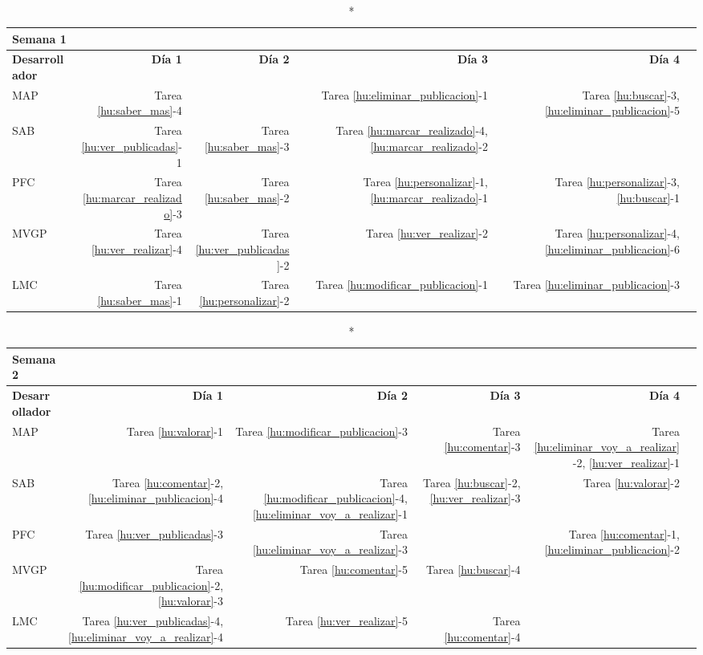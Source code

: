 \documentclass[11pt]{article}
\begin{document}
\begin{longtable}{lrrrrr}
  \caption*{Semana 1}\\
  \toprule
  \textbf{Desarrollador} & \textbf{Día 1} & \textbf{Día 2} & \textbf{Día 3} & \textbf{Día 4} \\
  \midrule
  MAP & Tarea \ref{hu:saber_mas}-4 &  & Tarea \ref{hu:eliminar_publicacion}-1 & Tarea \ref{hu:buscar}-3, \ref{hu:eliminar_publicacion}-5    \\
  SAB & Tarea \ref{hu:ver_publicadas}-1 & Tarea \ref{hu:saber_mas}-3 &  Tarea \ref{hu:marcar_realizado}-4, \ref{hu:marcar_realizado}-2 & \\
  PFC &Tarea \ref{hu:marcar_realizado}-3 & Tarea \ref{hu:saber_mas}-2 & Tarea \ref{hu:personalizar}-1, \ref{hu:marcar_realizado}-1 & Tarea \ref{hu:personalizar}-3, \ref{hu:buscar}-1\\
  MVGP &Tarea \ref{hu:ver_realizar}-4 & Tarea \ref{hu:ver_publicadas}-2  & Tarea \ref{hu:ver_realizar}-2 &Tarea \ref{hu:personalizar}-4, \ref{hu:eliminar_publicacion}-6 \\
  LMC & Tarea \ref{hu:saber_mas}-1 & Tarea \ref{hu:personalizar}-2 &Tarea  \ref{hu:modificar_publicacion}-1 & Tarea \ref{hu:eliminar_publicacion}-3 \\
  \bottomrule
\end{longtable}

\begin{longtable}{lrrrrr}
  \caption*{Semana 2}\\
  \toprule
  \textbf{Desarrollador} & \textbf{Día 1} & \textbf{Día 2} & \textbf{Día 3} & \textbf{Día 4} \\
  \midrule
  MAP & Tarea \ref{hu:valorar}-1 & Tarea \ref{hu:modificar_publicacion}-3 & Tarea \ref{hu:comentar}-3 & Tarea \ref{hu:eliminar_voy_a_realizar}-2, \ref{hu:ver_realizar}-1  \\
  SAB & Tarea \ref{hu:comentar}-2, \ref{hu:eliminar_publicacion}-4  &Tarea \ref{hu:modificar_publicacion}-4, \ref{hu:eliminar_voy_a_realizar}-1  & Tarea \ref{hu:buscar}-2, \ref{hu:ver_realizar}-3  & Tarea \ref{hu:valorar}-2 \\
  PFC &Tarea \ref{hu:ver_publicadas}-3& Tarea \ref{hu:eliminar_voy_a_realizar}-3 && Tarea \ref{hu:comentar}-1,\ref{hu:eliminar_publicacion}-2\\
  MVGP &Tarea \ref{hu:modificar_publicacion}-2, \ref{hu:valorar}-3 &Tarea \ref{hu:comentar}-5 & Tarea \ref{hu:buscar}-4  &  & \\
  LMC & Tarea \ref{hu:ver_publicadas}-4, \ref{hu:eliminar_voy_a_realizar}-4   & Tarea \ref{hu:ver_realizar}-5  & Tarea \ref{hu:comentar}-4&\\
  \bottomrule
\end{longtable}
\end{document}
